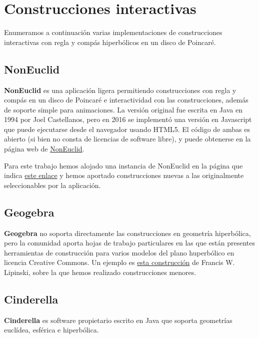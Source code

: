 \documentclass{article}
\theoremstyle{plain}
\theoremstyle{definition}
\theoremstyle{remark}
\begin{document}
\section{Construcciones interactivas}
Enumeramos a continuación varias implementaciones de construcciones interactivas
con regla y compás hiperbólicos en un disco de Poincaré.

\subsection{NonEuclid}
\textbf{NonEuclid} es una aplicación ligera permitiendo construcciones
con regla y compás en un disco de Poincaré e interactividad con las
construcciones, además de soporte simple para animaciones. La versión
original fue escrita en Java en 1994 por Joel Castellanos, pero en
2016 se implementó una versión en Javascript que puede ejecutarse
desde el navegador usando HTML5. El código de ambas es abierto (si
bien no consta de licencias de software libre), y puede obtenerse en
la página web de
\href{https://www.cs.unm.edu/~joel/NonEuclid/NonEuclid.html}{NonEuclid}.

Para este trabajo hemos alojado una instancia de NonEuclid en la
página que indica \href{https://m42.github.io/hiperboloide/}{este
  enlace} y hemos aportado construcciones nuevas a las originalmente
seleccionables por la aplicación.

\subsection{Geogebra}
\textbf{Geogebra} no soporta directamente las construcciones en geometría
hiperbólica, pero la comunidad aporta hojas de trabajo particulares en las
que están presentes herramientas de construcción para varios modelos del
plano huperbólico en licencia Creative Commons. Un ejemplo es
\href{https://www.geogebra.org/material/show/id/2028857}{esta construcción}
de Francis W. Lipinski, sobre la que hemos realizado construcciones menores.

\subsection{Cinderella}
\textbf{Cinderella} es software propietario escrito en Java que soporta geometrías
euclídea, esférica e hiperbólica.
\end{document}
